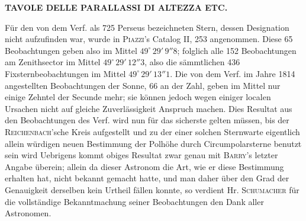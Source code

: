 \clearpage
\endgroup
\clearpage
\begingroup
\pagestyle{empty}
\newcommand{\GaussVIGathering}[1]{%
  \fancypagestyle{gaussVIGathering}{%
    \fancyhf{}%
    \renewcommand{\headrulewidth}{0pt}%
    \renewcommand{\footrulewidth}{0pt}%
    \fancyfoot[C]{\makebox[\textwidth][l]{%
      \hspace*{.025\textwidth}{\footnotesize\bfseries VI.}\hfill
      {\normalsize\bfseries\textls[90]{#1}}\hspace*{.18\textwidth}}}%
  }%
  \thispagestyle{gaussVIGathering}%
}
\thispagestyle{empty}
\noindent{}%
\makebox[12mm][l]{}%
\parbox[t]{\dimexpr\linewidth-24mm\relax}{\centering\footnotesize\bfseries TAVOLE DELLE PARALLASSI DI ALTEZZA ETC.\par}%
\par\medskip
\noindent Für den von dem Verf. als 725 Perseus bezeichneten Stern, dessen Designation nicht aufzufinden war, wurde in \textsc{Piazzi}'s Catalog II, 253 angenommen. Diese 65 Beobachtungen geben also im Mittel $49^\circ\,29'\,9''8$; folglich alle 152 Beobachtungen am Zenithsector im Mittel $49^\circ\,29'\,12''3$, also die sämmtlichen 436 Fixsternbeobachtungen im Mittel $49^\circ\,29'\,13''1$. Die von dem Verf. im Jahre 1814 angestellten Beobachtungen der Sonne, 66 an der Zahl, geben im Mittel nur einige Zehntel der Secunde mehr; sie können jedoch wegen einiger localen Ursachen nicht auf gleiche Zuverlässigkeit Anspruch machen. Dies Resultat aus den Beobachtungen des Verf. wird nun für das sicherste gelten müssen, bis der \textsc{Reichenbach}'sche Kreis aufgestellt und zu der einer solchen Sternwarte eigentlich allein würdigen neuen Bestimmung der Polhöhe durch Circumpolarsterne benutzt sein wird  Uebrigens kommt obiges Resultat zwar genau mit \textsc{Barry}'s letzter Angabe überein; allein da dieser Astronom die Art, wie er diese Bestimmung erhalten hat, nicht bekannt gemacht hatte, und man daher über den Grad der Genauigkeit derselben kein Urtheil fällen konnte, so verdient Hr. \textsc{Schumacher} für die vollständige Bekanntmachung seiner Beobachtungen den Dank aller Astronomen.
